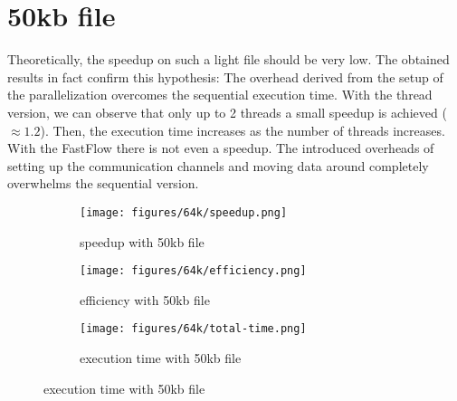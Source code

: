 \documentclass{report}
\begin{document}
\section{50kb file}
Theoretically, the speedup on such a light file should be very low.
The obtained results in fact confirm this hypothesis: The overhead derived
from the setup of the parallelization overcomes the sequential execution time.
With the thread version, we can observe that only up to 2 threads a small speedup is achieved ($\approx 1.2$).
Then, the execution time increases as the number of threads increases.
With the FastFlow there is not even a speedup. The introduced overheads of setting
up the communication channels and moving data around completely overwhelms the sequential version.
\begin{figure}[H]
    \begin{subfigure}{0.5\textwidth}
        \centering
        \texttt{[image: figures/64k/speedup.png]}
        \caption{speedup with 50kb file}
    \end{subfigure}
    \begin{subfigure}{0.5\textwidth}
        \centering
        \texttt{[image: figures/64k/efficiency.png]}
        \caption{efficiency with 50kb file}
    \end{subfigure}
    \begin{subfigure}{0.5\textwidth}
        \centering
        \texttt{[image: figures/64k/total-time.png]}
        \caption{execution time with 50kb file}
    \end{subfigure}
\end{figure}
\end{document}
